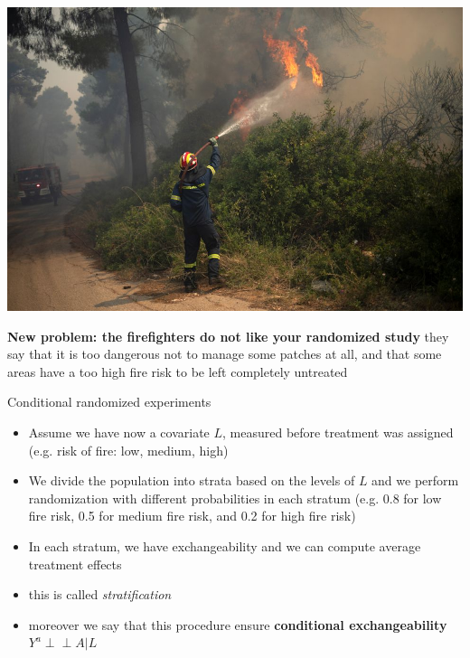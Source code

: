 \documentclass{beamer}
\newcommand{\indep}{\perp \!\!\! \perp}
\begin{document}
\begin{frame}
	\includegraphics[scale=0.2]{fire}

	\textbf{New problem: the firefighters do not like your randomized study}
	they say that it is too dangerous not to manage some patches at all, and that some
	areas have a too high fire risk to be left completely untreated
\end{frame}

\begin{frame}{Conditional randomized experiments}
  \begin{itemize}
    \item<1-> Assume we have now a covariate $L$, measured before treatment was assigned
      (e.g. risk of fire: low, medium, high)
    \item<2-> We divide the population into strata based on the levels of $L$
      and we perform randomization with different probabilities in each stratum
      (e.g. 0.8 for low fire risk, 0.5 for medium fire risk, and 0.2 for high fire risk)
    \item<3-> In each stratum, we have exchangeability and we can compute
      average treatment effects
    \item<4-> this is called \emph{stratification}
    \item<5-> moreover we say that this procedure ensure \textbf{conditional exchangeability}                          $Y^a \indep A | L$
  \end{itemize}
\end{frame}
\end{document}
